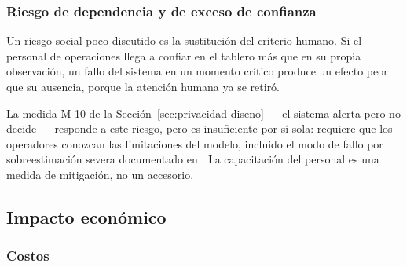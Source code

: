 \subsubsection{Riesgo de dependencia y de exceso de confianza}

Un riesgo social poco discutido es la sustitución del criterio humano.
Si el personal de operaciones llega a confiar en el tablero más que en su
propia observación, un fallo del sistema en un momento crítico produce un
efecto peor que su ausencia, porque la atención humana ya se retiró.

La medida M-10 de la Sección~\ref{sec:privacidad-diseno} --- el sistema
alerta pero no decide --- responde a este riesgo, pero es insuficiente por
sí sola: requiere que los operadores conozcan las limitaciones del modelo,
incluido el modo de fallo por sobreestimación severa documentado en
\cite{Lin_2025_CVPR}. La capacitación del personal es una medida de
mitigación, no un accesorio.

\subsection{Impacto económico}
\label{sec:impacto-economico}


\subsubsection{Costos}

